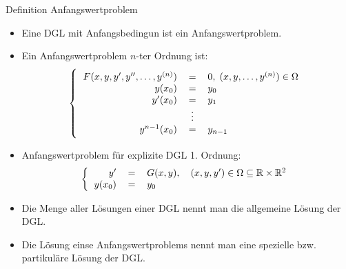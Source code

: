 \begin{definition}{Definition Anfangswertproblem}\\
  \begin{itemize}
    \item Eine DGL mit Anfangsbedingun ist ein Anfangswertproblem.
    \item Ein Anfangswertproblem \(n\)-ter Ordnung ist:
      \[\left\{\begin{tabular}{rcl}
	  \( F(x,y,y',y'',\ldots,y^{(n)})\)&\(=\)&\(0,\;(x,y,\ldots,y^{(n)})\in \Omega\)\\
	  \(y(x_0)\)&\(=\)&\(y_0\)\\
	  \(y'(x_0)\)&\(=\)&\(y_1\)\\
		\(\) &\(\vdots\)&\(\)\\
	 \( y^{n-1}(x_0)\)&\(=\)&\( y_{n-1}\)
      \end{tabular}\right.\]
    \item Anfangswertproblem für explizite DGL 1. Ordnung:
      \[\left\{\begin{tabular}{rcl}
	  \(y'\)&\(=\)&\(G(x,y),\quad (x,y,y')\in \Omega\subseteq\mathbb{R}\times\mathbb{R}^2\)\\
	  \(y(x_0)\)&\(=\)&\(y_0\)
      \end{tabular}\right.\]
    \item Die Menge aller Lösungen einer DGL nennt man die allgemeine Lösung der DGL.
    \item Die Lösung einse Anfangswertproblems nennt man eine spezielle bzw. partikuläre Lösung der DGL.
  \end{itemize}
\end{definition}
